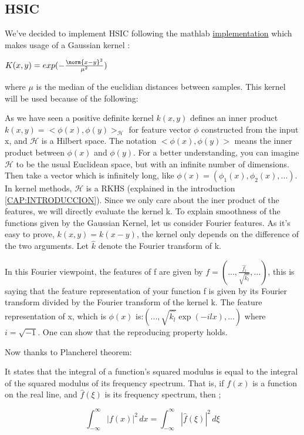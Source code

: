 \subsection{HSIC}

We've decided to implement HSIC following the mathlab \href{http://www.gatsby.ucl.ac.uk/~gretton/indepTestFiles/indep.htm#GreEtAl10}{implementation} which makes usage of a Gaussian kernel :

$K(x,y) = exp(-\frac{\norm{x-y}^{2}}{\mu^{2}})$

where $\mu$ is the median of the euclidian distances between samples.
This kernel will be used because of the following:

As we have seen a positive definite kernel $k(x,y)$ defines an inner product $k(x,y) = <\phi(x),\phi(y)>_{\mathcal{H}}$ for feature vector $\phi$ constructed from the input x, and $\mathcal{H}$ is a Hilbert space. The notation $<\phi(x),\phi(y)>$ means the inner product between $\phi(x)$ and $\phi(y)$.
For a better understanding, you can imagine $\mathcal{H}$ to be the usual Euclidean space, but with an infinite number of dimensions. Then take a vector which is infinitely long, like $\phi(x) = (\phi_{1}(x),\phi_{2}(x),...)$. In kernel methods, $\mathcal{H}$ is a RKHS (explained in the introduction \ref{CAP:INTRODUCCION}). Since we only care about the iner product of the features, we will directly evaluate the kernel k.
To explain smoothness of the functions given by the Gaussian Kernel, let us consider Fourier features. As it's easy to prove, $k(x,y)=k(x-y)$, the kernel only depends on the difference of the two arguments. Let $\hat{k}$ denote the Fourier transform of k.

In this Fourier viewpoint, the features of f are given by $f = (...,\frac{\hat{f_{l}}}{\sqrt{\hat{k_{l}}}},...)$, this is saying that the feature representation of your function f is given by its Fourier transform divided by the Fourier transform of the kernel k. The feature representation of x, which is $\phi(x)$ is:$(...,\sqrt{\hat{k_{l}}}\exp(-ilx),...)$ where $i = \sqrt{-1}$. One can show that the reproducing property holds.

Now thanks to Plancherel theorem: \cite{plancherel}

It states that the integral of a function's squared modulus is equal to the integral of the squared modulus of its frequency spectrum. That is, if $f(x)$ is a function on the real line, and ${\widehat {f}}(\xi )$ is its frequency spectrum, then ; 

$$
\int _{-\infty }^{\infty }|f(x)|^{2}\,dx=\int _{-\infty }^{\infty }|{\widehat {f}}(\xi )|^{2}\,d\xi
$$

